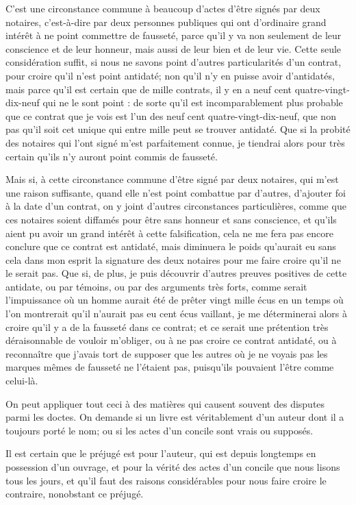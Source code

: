 C'est une circonstance commune à beaucoup d'actes d'être signés par deux notaires, c'est-à-dire par deux personnes publiques qui ont d'ordinaire grand intérêt à ne point commettre de fausseté, parce qu'il y va non seulement de leur conscience et de leur honneur, mais aussi de leur bien et de leur vie. Cette seule considération suffit, si nous ne savons point d'autres particularités d'un contrat, pour croire qu'il n'est point antidaté; non qu'il n'y en puisse avoir d'antidatés, mais parce qu'il est certain que de mille contrats, il y en a neuf cent quatre-vingt-dix-neuf qui ne le sont point : de sorte qu'il est incomparablement plus probable que ce contrat que je vois est l'un des neuf cent quatre-vingt-dix-neuf, que non pas qu'il soit cet unique qui entre mille peut se trouver antidaté. Que si la probité des notaires qui l'ont signé m'est parfaitement connue, je tiendrai alors pour très certain qu'ils n'y auront point commis de fausseté.

Mais si, à cette circonstance commune d'être signé par deux notaires, qui m'est une raison suffisante, quand elle n'est point combattue par d'autres, d'ajouter foi à la date d'un contrat, on y joint d'autres circonstances particulières, comme que ces notaires soient diffamés pour être sans honneur et sans conscience, et qu'ils aient pu avoir un grand intérêt à cette falsification, cela ne me fera pas encore conclure que ce contrat est antidaté, mais diminuera le poids qu'aurait eu sans cela dans mon esprit la signature des deux notaires pour me faire croire qu'il ne le serait pas. Que si, de plus, je puis découvrir d'autres preuves positives de cette antidate, ou par témoins, ou par des arguments très forts, comme serait l'impuissance où un homme aurait été de prêter vingt mille écus en un temps où l'on montrerait qu'il n'aurait pas eu cent écus vaillant, je me déterminerai alors à croire qu'il y a de la fausseté dans ce contrat; et ce serait une prétention très déraisonnable de vouloir m'obliger, ou à ne pas croire ce contrat antidaté, ou à reconnaître que j'avais tort de supposer que les autres où je ne voyais pas les marques mêmes de fausseté ne l'étaient pas, puisqu'ils pouvaient l'être comme celui-là.

On peut appliquer tout ceci à des matières qui causent souvent des disputes parmi les doctes. On demande si un livre est véritablement d'un auteur dont il a toujours porté le nom; ou si les actes d'un concile sont vrais ou supposés.

Il est certain que le préjugé est pour l'auteur, qui est depuis longtemps en possession d'un ouvrage, et pour la vérité des actes d'un concile que nous lisons tous les jours, et qu'il faut des raisons considérables pour nous faire croire le contraire, nonobstant ce préjugé.

